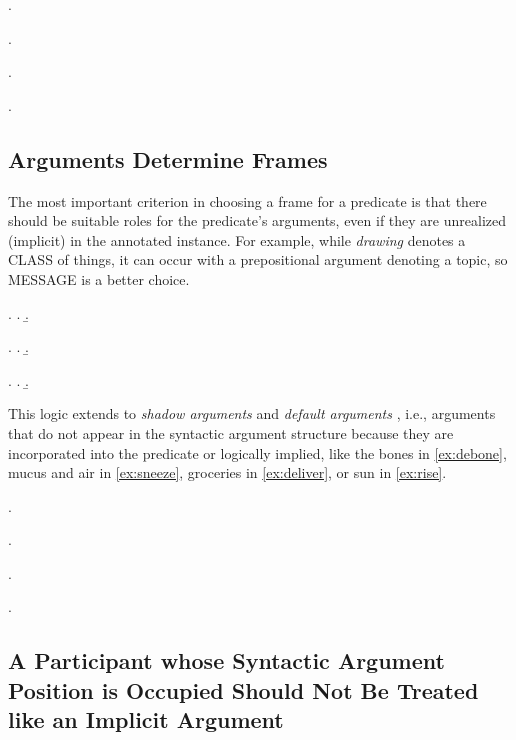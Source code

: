 \documentclass[a4paper]{article}
\newcommand{\fr}[1]{\textsf{#1}}
\newcommand{\rl}[1]{\textsf{#1}}
\begin{document}
\ex.

\ex.

\ex.

\ex.

\newpage\subsection{Arguments Determine Frames}

The most important criterion in choosing a frame for a predicate is that there
should be suitable roles for the predicate's arguments, even if they are
unrealized (implicit) in the annotated instance. For example, while
\emph{drawing} denotes a \fr{CLASS} of things, it can occur with a
prepositional argument denoting a \rl{topic}, so \fr{MESSAGE} is a better
choice.

\ex.
\a.
\b.

\ex.
\a.
\b.

\ex.
\a.
\b.

This logic extends to \emph{shadow arguments} and \emph{default arguments}
\citep{pustejovsky-1995-generative,di-fabio-etal-2019-verbatlas}, i.e., arguments
that do not appear in the syntactic argument structure because they are
incorporated into the predicate or logically implied, like the bones in
\ref{ex:debone}, mucus and air in \ref{ex:sneeze}, groceries in
\ref{ex:deliver}, or sun in \ref{ex:rise}.

\ex.\label{ex:debone}

\ex.\label{ex:sneeze}

\ex.\label{ex:deliver}

\ex.\label{ex:rise}

\newpage\subsection{A Participant whose Syntactic Argument Position is Occupied Should Not Be Treated like an Implicit Argument}
\end{document}
